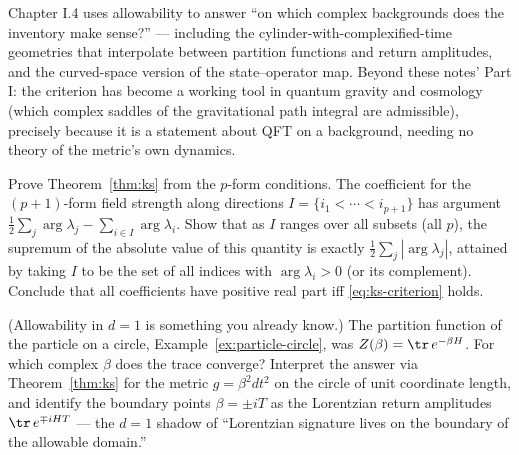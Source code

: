 \begin{ppreview}
Chapter I.4 uses allowability to answer ``on which complex backgrounds does
the inventory make sense?'' --- including the cylinder-with-complexified-time
geometries that interpolate between partition functions and return amplitudes,
and the curved-space version of the state--operator map. Beyond these notes'
Part I: the criterion has become a working tool in quantum gravity and
cosmology (which complex saddles of the gravitational path integral are
admissible), precisely because it is a statement about QFT on a background,
needing no theory of the metric's own dynamics.
\end{ppreview}

\begin{exercise}[medium]
\label{exr:ks-worst}
Prove Theorem~\ref{thm:ks} from the $p$-form conditions. The coefficient for
the $(p+1)$-form field strength along directions $I = \{i_1 < \cdots <
i_{p+1}\}$ has argument $\frac12\sum_j \arg\lambda_j - \sum_{i \in I}
\arg\lambda_i$. Show that as $I$ ranges over all subsets (all $p$), the
supremum of the absolute value of this quantity is exactly
$\frac12\sum_j|\arg\lambda_j|$, attained by taking $I$ to be the set of all
indices with $\arg \lambda_i > 0$ (or its complement). Conclude that all
coefficients have positive real part iff \eqref{eq:ks-criterion} holds.
\end{exercise}

\begin{exercise}[easy]
\label{exr:complex-beta}
(Allowability in $d=1$ is something you already know.) The partition function
of the particle on a circle, Example~\ref{ex:particle-circle}, was $Z(\beta) =
\tr\, e^{-\beta H}$. For which complex $\beta$ does the trace converge?
Interpret the answer via Theorem~\ref{thm:ks} for the metric $g = \beta^2
dt^2$ on the circle of unit coordinate length, and identify the boundary
points $\beta = \pm i T$ as the Lorentzian return amplitudes $\tr\,
e^{\mp iHT}$ --- the $d=1$ shadow of ``Lorentzian signature lives on the
boundary of the allowable domain.''
\end{exercise}

